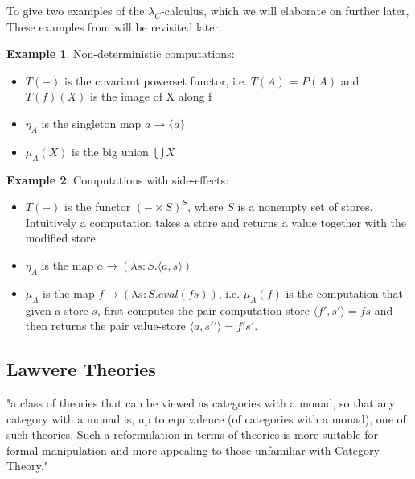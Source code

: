\documentclass[a4paper,10pt]{article}
\theoremstyle{definition}
\newtheorem{example}{Example}[section]
\begin{document}
To give two examples of the $\lambda_C$-calculus, which we will elaborate on further later,
These examples from \cite{moggi1989computational}\cite{moggi1991notions} will be revisited later.
\vspace{5mm}

\begin{example}
    Non-deterministic computations:
    \begin{itemize}
        \item $T(-)$ is the covariant powerset functor,
            i.e.  $T(A)$ = $P(A)$ and $T(f)(X)$ is the image of X along f
        \item $\eta_A$ is the singleton map $a \rightarrow  \{a\}$
        \item $\mu_A(X)$ is the big union $\bigcup X$
    \end{itemize}
\end{example}

\vspace{5mm}

\begin{example}
    Computations with side-effects:
    \begin{itemize}
        \item $T(-)$ is the functor $(-\times S)^S$, where $S$ is a nonempty set of stores.
            Intuitively a computation takes a store and returns a value together with the modified store.
        \item $\eta_A$ is the map $a \rightarrow (\lambda s:S.\langle a,s \rangle)$
        \item $\mu_A$ is the map $f \rightarrow (\lambda s:S.eval(fs))$,
            i.e. $\mu_A(f)$ is the computation that given a store $s$,
            first computes the pair computation-store $\langle f\prime,s\prime\rangle = fs$
            and then returns the pair value-store $\langle a,s\prime\prime\rangle = f\prime s\prime$.
    \end{itemize}
\end{example}

\subsection{Lawvere Theories}
"a class of theories that can be viewed as categories with a monad, so that any category with a monad is, up to equivalence (of categories with a monad), one of such theories. Such a reformulation in terms of theories is more suitable for formal manipulation and more appealing to those unfamiliar with Category Theory."
\cite{moggi1991notions}
\end{document}
